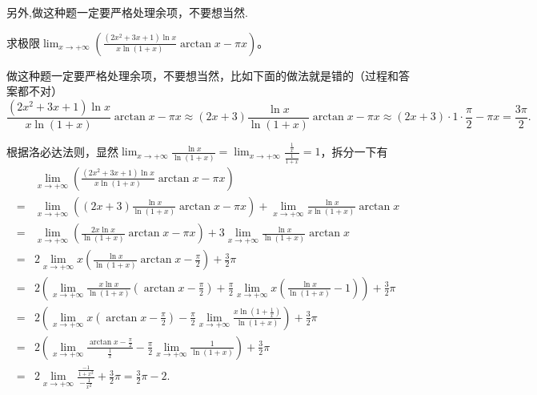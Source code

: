 \documentclass[../../main.tex]{subfiles}%
\begin{document}
\begin{remark}
另外,做这种题一定要严格处理余项，不要想当然.
\end{remark}
\begin{example}
求极限\(\lim_{x\rightarrow +\infty}\left(\frac{(2x^2 + 3x + 1)\ln x}{x\ln(1 + x)}\arctan x-\pi x\right)\)。
\end{example}
\begin{remark}
做这种题一定要严格处理余项，不要想当然，比如下面的做法就是错的（过程和答案都不对）
\[\frac{(2x^2 + 3x + 1)\ln x}{x\ln(1 + x)}\arctan x-\pi x\approx(2x + 3)\frac{\ln x}{\ln(1 + x)}\arctan x-\pi x\approx(2x + 3)\cdot1\cdot\frac{\pi}{2}-\pi x=\frac{3\pi}{2}.\]
\end{remark}
\begin{solution}

根据洛必达法则，显然\(\lim_{x\rightarrow +\infty}\frac{\ln x}{\ln(1 + x)}=\lim_{x\rightarrow +\infty}\frac{\frac{1}{x}}{\frac{1}{1 + x}} = 1\)，拆分一下有
\begin{align*}
&\lim_{x\rightarrow +\infty}\left(\frac{(2x^2 + 3x + 1)\ln x}{x\ln(1 + x)}\arctan x-\pi x\right)\\
=&\lim_{x\rightarrow +\infty}\left((2x + 3)\frac{\ln x}{\ln(1 + x)}\arctan x-\pi x\right)+\lim_{x\rightarrow +\infty}\frac{\ln x}{x\ln(1 + x)}\arctan x\\
=&\lim_{x\rightarrow +\infty}\left(\frac{2x\ln x}{\ln(1 + x)}\arctan x-\pi x\right)+3\lim_{x\rightarrow +\infty}\frac{\ln x}{\ln(1 + x)}\arctan x\\
=&2\lim_{x\rightarrow +\infty}x\left(\frac{\ln x}{\ln(1 + x)}\arctan x-\frac{\pi}{2}\right)+\frac{3}{2}\pi\\
=&2\left(\lim_{x\rightarrow +\infty}\frac{x\ln x}{\ln(1 + x)}\left(\arctan x-\frac{\pi}{2}\right)+\frac{\pi}{2}\lim_{x\rightarrow +\infty}x\left(\frac{\ln x}{\ln(1 + x)}-1\right)\right)+\frac{3}{2}\pi\\
=&2\left(\lim_{x\rightarrow +\infty}x\left(\arctan x-\frac{\pi}{2}\right)-\frac{\pi}{2}\lim_{x\rightarrow +\infty}\frac{x\ln(1 + \frac{1}{x})}{\ln(1 + x)}\right)+\frac{3}{2}\pi\\
=&2\left(\lim_{x\rightarrow +\infty}\frac{\arctan x-\frac{\pi}{2}}{\frac{1}{x}}-\frac{\pi}{2}\lim_{x\rightarrow +\infty}\frac{1}{\ln(1 + x)}\right)+\frac{3}{2}\pi\\
=&2\lim_{x\rightarrow +\infty}\frac{\frac{-1}{1 + x^2}}{-\frac{1}{x^2}}+\frac{3}{2}\pi=\frac{3}{2}\pi - 2.
\end{align*}

\end{solution}
\end{document}
